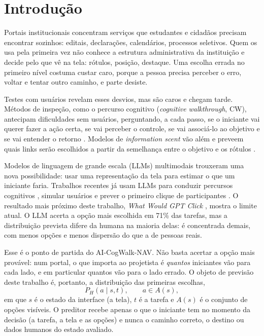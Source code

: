 \documentclass[12pt]{article}
\newcommand{\proj}{AI-CogWalk-NAV}
\newcommand{\Ph}{P_H}
\begin{document}
\clearpage
\tableofcontents
\clearpage
\section{Introdução}
\label{sec:intro}

Portais institucionais concentram serviços que estudantes e cidadãos precisam encontrar sozinhos: editais, declarações, calendários, processos seletivos. Quem os usa pela primeira vez não conhece a estrutura administrativa da instituição e decide pelo que vê na tela: rótulos, posição, destaque. Uma escolha errada no primeiro nível costuma custar caro, porque a pessoa precisa perceber o erro, voltar e tentar outro caminho, e parte desiste.

Testes com usuários revelam esses desvios, mas são caros e chegam tarde. Métodos de inspeção, como o percurso cognitivo (\textit{cognitive walkthrough}, CW), antecipam dificuldades sem usuários, perguntando, a cada passo, se o iniciante vai querer fazer a ação certa, se vai perceber o controle, se vai associá-lo ao objetivo e se vai entender o retorno \cite{polson1992cw,wharton1994cw}. Modelos de \textit{information scent} vão além e preveem quais links serão escolhidos a partir da semelhança entre o objetivo e os rótulos \cite{pirolli1999foraging,blackmon2002cww,fu2007snifact}.

Modelos de linguagem de grande escala (LLMs) multimodais trouxeram uma nova possibilidade: usar uma representação da tela para estimar o que um iniciante faria. Trabalhos recentes já usam LLMs para conduzir percursos cognitivos \cite{bisante2024cwgpt,zhong2025syntheticcw}, simular usuários \cite{lu2025uxagent,tan2026avenirux,chowdhury2026amuser} e prever o primeiro clique de participantes \cite{kuric2026wwgc,hu2025uitransition}. O resultado mais próximo deste trabalho, \textit{What Would GPT Click} \cite{kuric2026wwgc}, mostra o limite atual. O LLM acerta a opção mais escolhida em 71\% das tarefas, mas a distribuição prevista difere da humana na maioria delas: é concentrada demais, com menos opções e menos dispersão do que a de pessoas reais.

Esse é o ponto de partida do \proj. Não basta acertar a opção mais provável: num portal, o que importa ao projetista é \emph{quantos} iniciantes vão para cada lado, e em particular quantos vão para o lado errado. O objeto de previsão deste trabalho é, portanto, a distribuição das primeiras escolhas,
\begin{equation}
\Ph(a \mid s, t), \qquad a \in A(s),
\end{equation}
em que $s$ é o estado da interface (a tela), $t$ é a tarefa e $A(s)$ é o conjunto de opções visíveis. O preditor recebe apenas o que o iniciante tem no momento da decisão (a tarefa, a tela e as opções) e nunca o caminho correto, o destino ou dados humanos do estado avaliado.
\end{document}
